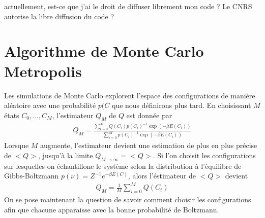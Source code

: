 {\color{red} actuellement, est-ce que j'ai le droit de diffuser librement mon code ? Le CNRS autorise la libre diffusion du code ?}

    \section{Algorithme de Monte Carlo Metropolis}

Les simulations de Monte Carlo explorent l'espace des configurations de manière aléatoire \cite{newman_monte_1999} avec une probabilité $p(C$ que nous définirons plus tard. En choisissant $M$ états ${C_0,...,C_M}$, l'estimateur $Q_M$ de $Q$ est donnée par
\begin{align}
    Q_M = \frac{\sum_{i=0}^M Q(C_i) p(C_i)^{-1} \exp(-\beta E(C_i))}{\sum_{i=0}^M  p(C_i)^{-1} \exp(-\beta E(C_i))}
\end{align}
Lorsque $M$ augmente, l'estimateur devient une estimation de plus en plus précise de $<Q>$, jusqu'à la limite $Q_{M\to \infty} = <Q>$. Si l'on choisit les configurations sur lesquelles on échantillone le système selon la distribution à l'équilibre de Gibbs-Boltzmann $p(\nu) = Z^{-1} e^{-\beta E(C)}$, alors l'éstimateur de $<Q>$ devient
\begin{align}
    Q_M = \frac{1}{M} \sum_{i=0}^M Q(C_i)
\end{align}
On se pose maintenant la question de savoir comment choisir les configurations afin que chacune apparaisse avec la bonne probabilité de Boltzmann. 

